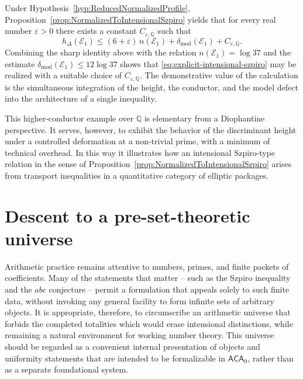 \documentclass[10pt, reqno]{amsart}
\theoremstyle{plain}
\theoremstyle{definition}
\theoremstyle{plain}
\newcommand{\Q}{\mathbb{Q}}
\newcommand{\defect}{\delta_{\mathrm{mod}}}
\begin{document}
Under Hypothesis~\ref{hyp:ReducedNormalizedProfile}, Proposition~\ref{prop:NormalizedToIntensionalSzpiro} yields that for every real number $\varepsilon > 0$ there exists a constant $C_{\varepsilon,\Q}$ such that
\begin{equation}\label{eq:explicit-intensional-szpiro}
  h_\Delta(\mathcal{E}_1)
  \le
  (6+\varepsilon)\,n(\mathcal{E}_1)
  +
  \defect(\mathcal{E}_1)
  +
  C_{\varepsilon,\Q}.
\end{equation}
Combining the sharp identity above with the relation $n(\mathcal{E}_1)=\log 37$ and the estimate $\defect(\mathcal{E}_1)\le 12\log 37$ shows that \eqref{eq:explicit-intensional-szpiro} may be realized with a suitable choice of $C_{\varepsilon,\Q}$. The demonstrative value of the calculation is the simultaneous integration of the height, the conductor, and the model defect into the architecture of a single inequality.

This higher-conductor example over $\Q$ is elementary from a Diophantine perspective. It serves, however, to exhibit the behavior of the discriminant height under a controlled deformation at a non-trivial prime, with a minimum of technical overhead. In this way it illustrates how an intensional Szpiro-type relation in the sense of Proposition~\ref{prop:NormalizedToIntensionalSzpiro} arises from transport inequalities in a quantitative category of elliptic packages.

\section{Descent to a pre-set-theoretic universe}\label{sec:UniverseP}

Arithmetic practice remains attentive to numbers, primes, and finite packets of coefficients. Many of the statements that matter -- such as the Szpiro inequality and the $abc$ conjecture -- permit a formulation that appeals solely to such finite data, without invoking any general facility to form infinite sets of arbitrary objects. It is appropriate, therefore, to circumscribe an arithmetic universe that forbids the completed totalities which would erase intensional distinctions, while remaining a natural environment for working number theory. This universe should be regarded as a convenient internal presentation of objects and uniformity statements that are intended to be formalizable in $\mathsf{ACA}_0$, rather than as a separate foundational system.
\end{document}
